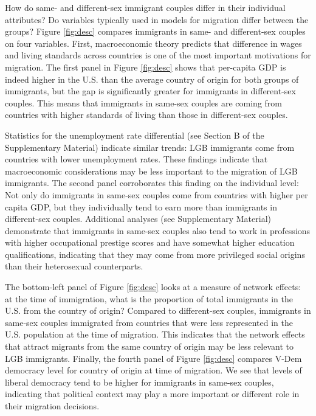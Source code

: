 \documentclass[
  12pt,
]{article}
\begin{document}
How do same- and different-sex immigrant couples differ in their individual attributes? Do variables typically used in models for migration differ between the groups? Figure \ref{fig:desc} compares immigrants in same- and different-sex couples on four variables. First, macroeconomic theory predicts that difference in wages and living standards across countries is one of the most important motivations for migration. The first panel in Figure \ref{fig:desc} shows that per-capita GDP is indeed higher in the U.S. than the average country of origin for both groups of immigrants, but the gap is significantly greater for immigrants in different-sex couples. This means that immigrants in same-sex couples are coming from countries with higher standards of living than those in different-sex couples.

Statistics for the unemployment rate differential (see Section B of the Supplementary Material) indicate similar trends: LGB immigrants come from countries with lower unemployment rates. These findings indicate that macroeconomic considerations may be less important to the migration of LGB immigrants. The second panel corroborates this finding on the individual level: Not only do immigrants in same-sex couples come from countries with higher per capita GDP, but they individually tend to earn more than immigrants in different-sex couples. Additional analyses (see Supplementary Material) demonstrate that immigrants in same-sex couples also tend to work in professions with higher occupational prestige scores and have somewhat higher education qualifications, indicating that they may come from more privileged social origins than their heterosexual counterparts.

The bottom-left panel of Figure \ref{fig:desc} looks at a measure of network effects: at the time of immigration, what is the proportion of total immigrants in the U.S. from the country of origin? Compared to different-sex couples, immigrants in same-sex couples immigrated from countries that were less represented in the U.S. population at the time of migration. This indicates that the network effects that attract migrants from the same country of origin may be less relevant to LGB immigrants. Finally, the fourth panel of Figure \ref{fig:desc} compares V-Dem democracy level for country of origin at time of migration. We see that levels of liberal democracy tend to be higher for immigrants in same-sex couples, indicating that political context may play a more important or different role in their migration decisions.
\end{document}
